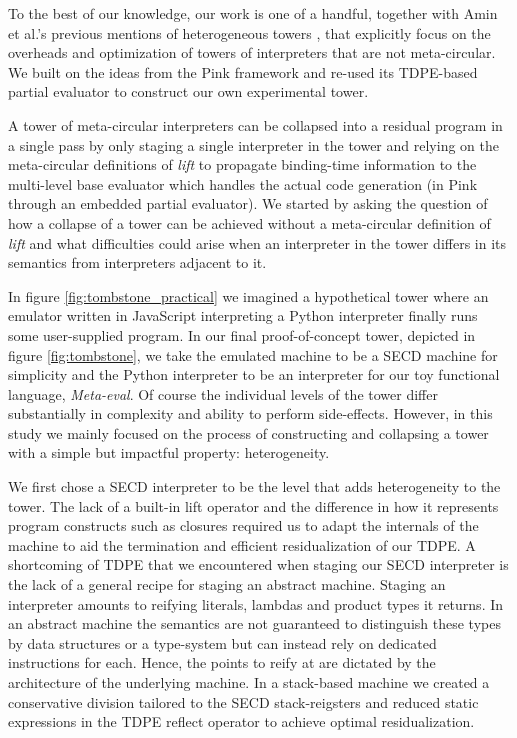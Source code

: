 \documentclass[a4paper,12pt,twoside,openright]{report}
\theoremstyle{definition}
\begin{document}
To the best of our knowledge, our work is one of a handful, together with Amin et al.'s previous mentions of heterogeneous towers \cite{amin2017collapsing}, that explicitly focus on the overheads and optimization of towers of interpreters that are not meta-circular. We built on the ideas from the Pink framework and re-used its TDPE-based partial evaluator to construct our own experimental tower.

A tower of meta-circular interpreters can be collapsed into a residual program in a single pass by only staging a single interpreter in the tower and relying on the meta-circular definitions of \textit{lift} to propagate binding-time information to the multi-level base evaluator which handles the actual code generation (in Pink through an embedded partial evaluator). We started by asking the question of how a collapse of a tower can be achieved without a meta-circular definition of \textit{lift} and what difficulties could arise when an interpreter in the tower differs in its semantics from interpreters adjacent to it.

In figure \ref{fig:tombstone_practical} we imagined a hypothetical tower where an emulator written in JavaScript interpreting a Python interpreter finally runs some user-supplied program. In our final proof-of-concept tower, depicted in figure \ref{fig:tombstone}, we take the emulated machine to be a SECD machine for simplicity and the Python interpreter to be an interpreter for our toy functional language, \textit{Meta-eval}. Of course the individual levels of the tower differ substantially in complexity and ability to perform side-effects. However, in this study we mainly focused on the process of constructing and collapsing a tower with a simple but impactful property: heterogeneity.

We first chose a SECD interpreter to be the level that adds heterogeneity to the tower. The lack of a built-in lift operator and the difference in how it represents program constructs such as closures required us to adapt the internals of the machine to aid the termination and efficient residualization of our TDPE. A shortcoming of TDPE that we encountered when staging our SECD interpreter is the lack of a general recipe for staging an abstract machine. Staging an interpreter amounts to reifying literals, lambdas and product types it returns. In an abstract machine the semantics are not guaranteed to distinguish these types by data structures or a type-system but can instead rely on dedicated instructions for each. Hence, the points to reify at are dictated by the architecture of the underlying machine. In a stack-based machine we created a conservative division tailored to the SECD stack-reigsters and reduced static expressions in the TDPE reflect operator to achieve optimal residualization.
\end{document}
